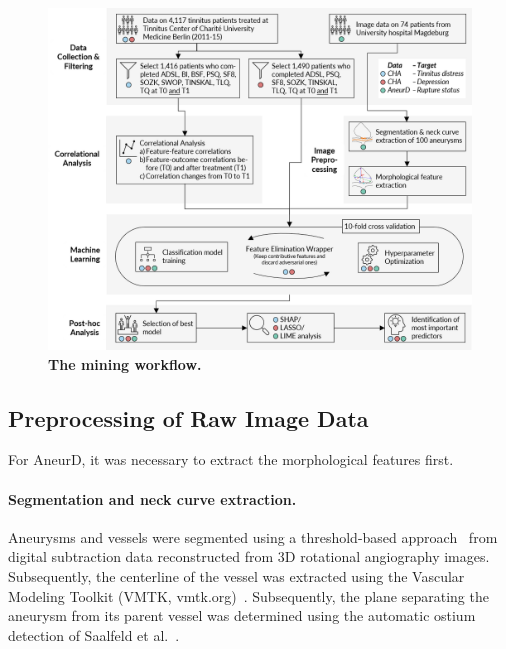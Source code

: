 \documentclass[
  oneside]{book}
\begin{document}
\begin{figure}[htbp]

{\centering \includegraphics[width=1\linewidth]{figures/09-iml-workflow-cropped} 

}

\caption{\textbf{The mining workflow.}}\label{fig:09-iml-workflow-cropped}
\end{figure}

\hypertarget{preprocessing-of-raw-image-data}{%
\subsection{Preprocessing of Raw Image Data}\label{preprocessing-of-raw-image-data}}

For AneurD, it was necessary to extract the morphological features first.

\paragraph*{Segmentation and neck curve extraction.}

Aneurysms and vessels were segmented using a threshold-based approach~\autocite{Glasser2015} from digital subtraction data reconstructed from 3D rotational angiography images.
Subsequently, the centerline of the vessel was extracted using the Vascular Modeling Toolkit (VMTK, vmtk.org)~\autocite{Antiga2008}.
Subsequently, the plane separating the aneurysm from its parent vessel was determined using the automatic ostium detection of Saalfeld et al.~\autocite{Saalfeld2018}.
\end{document}
